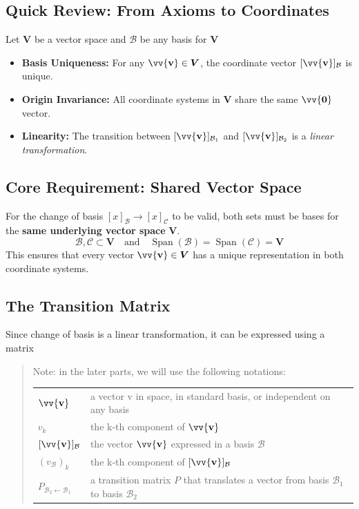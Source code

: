 \documentclass[11pt]{article}
\DeclareRobustCommand{\myvec}[1]{\vv{\mathbf{#1}}}
\newcommand{\mysubvecsp}[1]{\bm{{#1}}}
\newcommand{\myset}[1]{\mathcal{#1}}
\newcommand{\mymat}[1]{#1}
\begin{document}
    \subsection*{Quick Review: From Axioms to Coordinates}
    Let $\mysubvecsp{V}$ be a vector space and $\myset{B}$ be any basis for $\mysubvecsp{V}$
    \begin{itemize}
        \item \textbf{Basis Uniqueness:} For any $\myvec{v} \in \mysubvecsp{V}$, the coordinate vector $[\myvec{v}]_\myset{B}$ is unique.
        \item \textbf{Origin Invariance:} All coordinate systems in $\mysubvecsp{V}$ share the same $\myvec{0}$ vector.
        \item \textbf{Linearity:} The transition between $[\myvec{v}]_{\mathcal{B}_1}$ and $[\myvec{v}]_{\mathcal{B}_2}$ is a \textit{linear transformation}.
    \end{itemize}
    \subsection{Core Requirement: Shared Vector Space}
    For the change of basis $[x]_\myset{B} \to [x]_\myset{C}$ to be valid, both sets must be bases for the \textbf{same underlying vector space} $\mysubvecsp{V}$.
    \begin{equation}
        \myset{B}, \myset{C} \subset \mysubvecsp{V} \quad \text{and} \quad \operatorname{Span}(\myset{B}) = \operatorname{Span}(\myset{C}) = \mysubvecsp{V}
    \end{equation}
    This ensures that every vector $\myvec{v} \in \mysubvecsp{V}$ has a unique representation in both coordinate systems.
    \subsection{The Transition Matrix}
    Since change of basis is a linear transformation, it can be expressed using a matrix
    \begin{quote}
        Note: in the later parts, we will use the following notations: \vspace{\abovedisplayshortskip}

        \begin{tabular}{l l @{}}
            $\myvec{v}$ & a vector v in space, in standard basis, or independent on any basis \\[1ex]
            $v_k$ & the k-th component of $\myvec{v}$ \\[1ex]
            $[\myvec{v}]_\myset{B}$ & the vector $\myvec{v}$ expressed in a basis $\myset{B}$ \\[1ex]
            $(v_\myset{B})_k$ & the k-th component of $[\myvec{v}]_\myset{B}$ \\[1ex]
            $\mymat{P}_{\myset{B}_2\leftarrow\myset{B}_1}$ & a transition matrix $\mymat{P}$ that translates a vector from basis $\myset{B}_1$ to basis $\myset{B}_2$
        \end{tabular}
    \end{quote}
\end{document}
